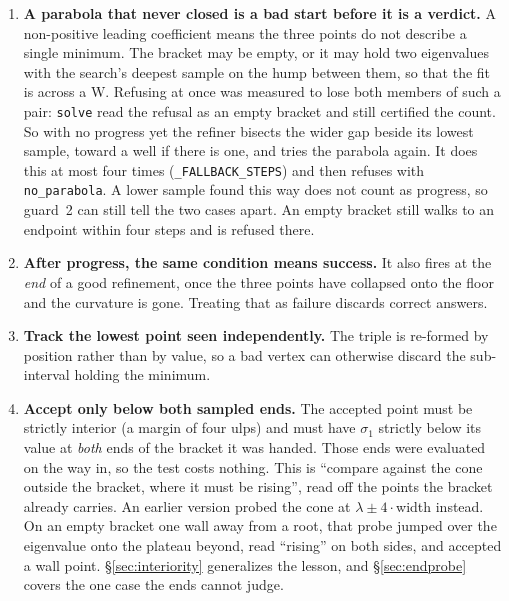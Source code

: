 \documentclass[11pt]{article}
\theoremstyle{definition}
\theoremstyle{remark}
\newcommand{\code}[1]{\texttt{#1}}
\newcommand{\lam}{\lambda}
\newcommand{\sig}{\sigma}
\begin{document}
\begin{enumerate}
\item \textbf{A parabola that never closed is a bad start before it is a verdict.} A
non-positive leading coefficient means the three points do not describe a single minimum. The
bracket may be empty, or it may hold two eigenvalues with the search's deepest sample on the
hump between them, so that the fit is across a W. Refusing at once was measured to lose both
members of such a pair: \code{solve} read the refusal as an empty bracket and still certified
the count. So with no progress yet the refiner bisects the wider gap beside its lowest sample,
toward a well if there is one, and tries the parabola again. It does this at most four times
(\code{\_FALLBACK\_STEPS}) and then refuses with \code{no\_parabola}. A lower sample found this
way does not count as progress, so guard~2 can still tell the two cases apart. An empty bracket
still walks to an endpoint within four steps and is refused there.
\item \textbf{After progress, the same condition means success.} It also fires at the
\emph{end} of a good refinement, once the three points have collapsed onto the floor and the
curvature is gone. Treating that as failure discards correct answers.
\item \textbf{Track the lowest point seen independently.} The triple is re-formed by position
rather than by value, so a bad vertex can otherwise discard the sub-interval holding the
minimum.
\item \textbf{Accept only below both sampled ends.} The accepted point must be strictly
interior (a margin of four ulps) and must have $\sig_1$ strictly below its value at
\emph{both} ends of the bracket it was handed. Those ends were evaluated on the way in, so the
test costs nothing. This is ``compare against the cone outside the bracket, where it must be
rising'', read off the points the bracket already carries. An earlier version probed the cone
at $\lam\pm4\cdot$width instead. On an empty bracket one wall away from a root, that probe
jumped over the eigenvalue onto the plateau beyond, read ``rising'' on both sides, and accepted
a wall point. \S\ref{sec:interiority} generalizes the lesson, and \S\ref{sec:endprobe} covers
the one case the ends cannot judge.
\end{enumerate}
\end{document}
